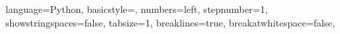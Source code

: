 \lstset
{ %
    language=Python,
    basicstyle=\footnotesize,
    numbers=left,
    stepnumber=1,
    showstringspaces=false,
    tabsize=1,
    breaklines=true,
    breakatwhitespace=false,
}

\renewcommand*{\lstlistingname}{Listato}